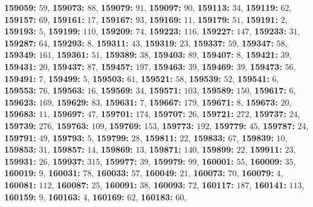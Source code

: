 \textsf{\bfseries 159059:} $59$, \textsf{\bfseries 159073:} $88$, \textsf{\bfseries 159079:} $91$, \textsf{\bfseries 159097:} $90$, \textsf{\bfseries 159113:} $34$, \textsf{\bfseries 159119:} $62$, \textsf{\bfseries 159157:} $69$, \textsf{\bfseries 159161:} $17$, \textsf{\bfseries 159167:} $93$, \textsf{\bfseries 159169:} $11$, \textsf{\bfseries 159179:} $51$, \textsf{\bfseries 159191:} $2$, \textsf{\bfseries 159193:} $5$, \textsf{\bfseries 159199:} $110$, \textsf{\bfseries 159209:} $74$, \textsf{\bfseries 159223:} $116$, \textsf{\bfseries 159227:} $147$, \textsf{\bfseries 159233:} $31$, \textsf{\bfseries 159287:} $64$, \textsf{\bfseries 159293:} $8$, \textsf{\bfseries 159311:} $43$, \textsf{\bfseries 159319:} $23$, \textsf{\bfseries 159337:} $59$, \textsf{\bfseries 159347:} $58$, \textsf{\bfseries 159349:} $161$, \textsf{\bfseries 159361:} $51$, \textsf{\bfseries 159389:} $38$, \textsf{\bfseries 159403:} $89$, \textsf{\bfseries 159407:} $8$, \textsf{\bfseries 159421:} $39$, \textsf{\bfseries 159431:} $20$, \textsf{\bfseries 159437:} $87$, \textsf{\bfseries 159457:} $197$, \textsf{\bfseries 159463:} $39$, \textsf{\bfseries 159469:} $39$, \textsf{\bfseries 159473:} $56$, \textsf{\bfseries 159491:} $7$, \textsf{\bfseries 159499:} $5$, \textsf{\bfseries 159503:} $61$, \textsf{\bfseries 159521:} $58$, \textsf{\bfseries 159539:} $52$, \textsf{\bfseries 159541:} $6$, \textsf{\bfseries 159553:} $76$, \textsf{\bfseries 159563:} $16$, \textsf{\bfseries 159569:} $34$, \textsf{\bfseries 159571:} $103$, \textsf{\bfseries 159589:} $150$, \textsf{\bfseries 159617:} $6$, \textsf{\bfseries 159623:} $169$, \textsf{\bfseries 159629:} $83$, \textsf{\bfseries 159631:} $7$, \textsf{\bfseries 159667:} $179$, \textsf{\bfseries 159671:} $8$, \textsf{\bfseries 159673:} $20$, \textsf{\bfseries 159683:} $11$, \textsf{\bfseries 159697:} $47$, \textsf{\bfseries 159701:} $174$, \textsf{\bfseries 159707:} $26$, \textsf{\bfseries 159721:} $272$, \textsf{\bfseries 159737:} $24$, \textsf{\bfseries 159739:} $276$, \textsf{\bfseries 159763:} $109$, \textsf{\bfseries 159769:} $153$, \textsf{\bfseries 159773:} $192$, \textsf{\bfseries 159779:} $45$, \textsf{\bfseries 159787:} $24$, \textsf{\bfseries 159791:} $49$, \textsf{\bfseries 159793:} $5$, \textsf{\bfseries 159799:} $28$, \textsf{\bfseries 159811:} $22$, \textsf{\bfseries 159833:} $67$, \textsf{\bfseries 159839:} $10$, \textsf{\bfseries 159853:} $31$, \textsf{\bfseries 159857:} $14$, \textsf{\bfseries 159869:} $13$, \textsf{\bfseries 159871:} $140$, \textsf{\bfseries 159899:} $22$, \textsf{\bfseries 159911:} $23$, \textsf{\bfseries 159931:} $26$, \textsf{\bfseries 159937:} $315$, \textsf{\bfseries 159977:} $39$, \textsf{\bfseries 159979:} $99$, \textsf{\bfseries 160001:} $55$, \textsf{\bfseries 160009:} $35$, \textsf{\bfseries 160019:} $9$, \textsf{\bfseries 160031:} $78$, \textsf{\bfseries 160033:} $57$, \textsf{\bfseries 160049:} $21$, \textsf{\bfseries 160073:} $70$, \textsf{\bfseries 160079:} $4$, \textsf{\bfseries 160081:} $112$, \textsf{\bfseries 160087:} $25$, \textsf{\bfseries 160091:} $38$, \textsf{\bfseries 160093:} $72$, \textsf{\bfseries 160117:} $187$, \textsf{\bfseries 160141:} $113$, \textsf{\bfseries 160159:} $9$, \textsf{\bfseries 160163:} $4$, \textsf{\bfseries 160169:} $62$, \textsf{\bfseries 160183:} $60$, 
